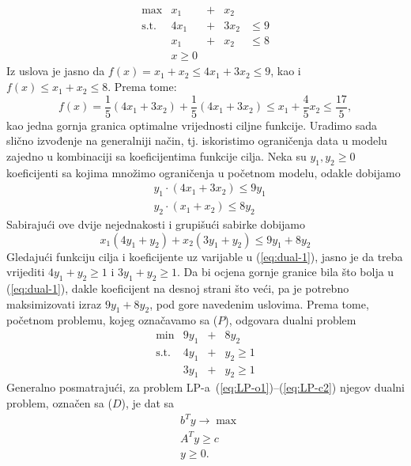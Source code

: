 \documentclass[a4paper, utf8, 11pt, colorlinks]{article}
\begin{document}
$$ 
\begin{array}{ccccc}
    \max                  &x_1 &+& x_2   &               \\
    \mbox{s.t.}  &4x_1 & +&3 x_2 & \leq 9        \\
                          &x_1 &+ &x_2   &  \leq 8       \\
                          &x \geq 0  &  &     &      
 \end{array}
$$
Iz uslova je jasno da $f(x) = x_1 + x_2 \leq 4 x_1 + 3 x_2 \leq 9$, kao i 
$f(x) \leq x_1 + x_2 \leq 8$. Prema tome:
$$f(x) = \frac{1}{5}(  4 x_1 + 3 x_2  ) + \frac{1}{5}(  4 x_1 + 3 x_2 ) \leq x_1 + \frac{4}{5}x_2 \leq \frac{17}{5},$$ kao jedna gornja granica optimalne vrijednosti ciljne funkcije. 
Uradimo sada slično izvođenje na generalniji način, tj. iskoristimo ograničenja data u modelu zajedno u kombinaciji sa koeficijentima funkcije cilja. Neka su $y_1, y_2 \geq 0$ koeficijenti sa kojima množimo ograničenja u početnom modelu, odakle dobijamo 
\begin{align*}
    &y_1 \cdot (4x_1 + 3x_2) \leq 9 y_1 \\
    &y_2 \cdot (x_1 + x_2 ) \leq 8 y_2 
\end{align*}
Sabirajući ove dvije nejednakosti i grupišući sabirke dobijamo 
\begin{equation}\label{eq:dual-1}
     x_1 ( 4 y_1 + y_2 ) + x_2 ( 3 y_1 + y_2 ) \leq 9 y_1 + 8 y_2 
\end{equation}
Gledajući funkciju cilja i koeficijente uz varijable u (\ref{eq:dual-1}), jasno je da treba vrijediti 
$4 y_1 + y_2 \geq 1$ i $3 y_1 + y_2 \geq 1$. Da bi ocjena gornje granice bila što bolja u (\ref{eq:dual-1}), dakle koeficijent na desnoj strani što veći, pa je potrebno maksimizovati izraz $9y_1 + 8 y_2$, pod gore navedenim uslovima. Prema tome, početnom problemu, kojeg označavamo sa ($P$), odgovara dualni problem 
$$\begin{array}{cccc}
     \min                    &  9 y_1 &+& 8 y_2        \\
     \mbox{s.t. }     &  4 y_1 &+& y_2 \geq 1   \\
                             &  3 y_1 &+& y_2 \geq 1
\end{array}$$
Generalno posmatrajući, za problem LP-a~(\ref{eq:LP-o1})--(\ref{eq:LP-c2}) njegov dualni problem, označen sa ($D$), je dat sa 
\begin{align}
     & b^T y \rightarrow \max \\
     & A^T y \geq c \\
     & y \geq 0.
\end{align}
\end{document}
